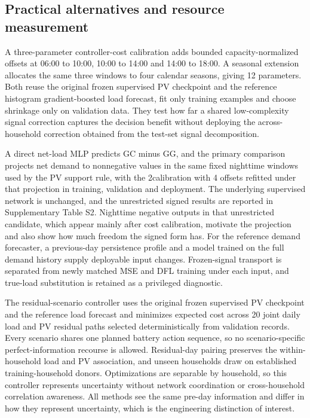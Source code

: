 \documentclass[pdflatex,Numbered,sn-basic]{sn-jnl}
\begin{document}
\subsection{Practical alternatives and resource measurement}

A three-parameter controller-cost calibration adds bounded capacity-normalized offsets at 06:00 to 10:00, 10:00 to 14:00 and 14:00 to 18:00. A seasonal extension allocates the same three windows to four calendar seasons, giving 12 parameters. Both reuse the original frozen supervised PV checkpoint and the reference histogram gradient-boosted load forecast, fit only training examples and choose shrinkage only on validation data. They test how far a shared low-complexity signal correction captures the decision benefit without deploying the across-household correction obtained from the test-set signal decomposition.

A direct net-load MLP predicts GC minus GG, and the primary comparison projects net demand to nonnegative values in the same fixed nighttime windows used by the PV support rule, with the 2calibration with 4 offsets refitted under that projection in training, validation and deployment. The underlying supervised network is unchanged, and the unrestricted signed results are reported in Supplementary Table S2. Nighttime negative outputs in that unrestricted candidate, which appear mainly after cost calibration, motivate the projection and also show how much freedom the signed form has. For the reference demand forecaster, a previous-day persistence profile and a model trained on the full demand history supply deployable input changes. Frozen-signal transport is separated from newly matched MSE and DFL training under each input, and true-load substitution is retained as a privileged diagnostic.

The residual-scenario controller uses the original frozen supervised PV checkpoint and the reference load forecast and minimizes expected cost across 20 joint daily load and PV residual paths selected deterministically from validation records. Every scenario shares one planned battery action sequence, so no scenario-specific perfect-information recourse is allowed. Residual-day pairing preserves the within-household load and PV association, and unseen households draw on established training-household donors. Optimizations are separable by household, so this controller represents uncertainty without network coordination or cross-household correlation awareness. All methods see the same pre-day information and differ in how they represent uncertainty, which is the engineering distinction of interest.
\end{document}
